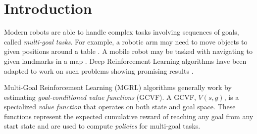 
\section{Introduction}

Modern robots are able to handle complex tasks involving sequences of
goals, called \textit{multi-goal tasks}.  For example, a robotic arm may
need to move objects to given positions around a table
\citep{gu2017deep}. A mobile robot may be tasked with navigating to
given landmarks in a map \citep{zhu2017target}. Deep Reinforcement
Learning algorithms have been adapted to work on such problems showing
promising results \citep{andrychowicz2017hindsight,pong2018temporal}. 

Multi-Goal Reinforcement Learning (MGRL) \citep{plappert2018multi}
algorithms generally work by estimating \emph{goal-conditioned value
functions} (GCVF). A GCVF, $V(s,g)$, is a specialized \emph{value
function} that operates on both state and goal space. These functions
represent the expected cumulative reward of reaching any goal from any
start state and are used to compute \emph{policies} for multi-goal
tasks. 

